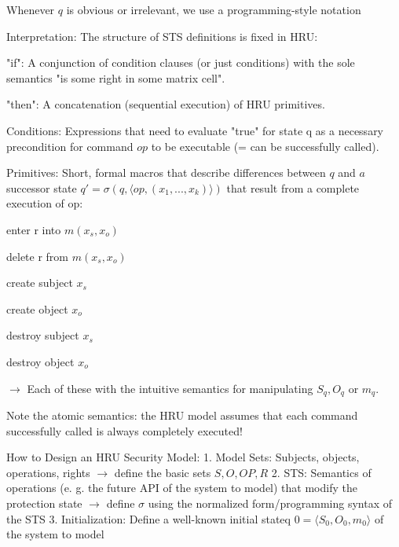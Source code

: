 \documentclass[a4paper]{article}
\begin{document}
\begin{multicols}{3}
    Whenever $q$ is obvious or irrelevant, we use a programming-style notation

    Interpretation: The structure of STS definitions is fixed in HRU:
    \begin{itemize*}
        \item "if": A conjunction of condition clauses (or just conditions) with the sole semantics "is some right in some matrix cell".
        \item "then": A concatenation (sequential execution) of HRU primitives.
    \end{itemize*}

    Conditions:
    Expressions that need to evaluate "true" for state q as a necessary precondition for command $op$ to be executable (= can be successfully called).

    Primitives:
    Short, formal macros that describe differences between $q$ and $a$ successor state $q'=\sigma(q,⟨op,(x_1 ,...,x_k)⟩)$ that result from a complete execution of op:
    \begin{itemize*}
        \item enter r into $m(x_s,x_o)$
        \item delete r from $m(x_s,x_o)$
        \item create subject $x_s$
        \item create object $x_o$
        \item destroy subject $x_s$
        \item destroy object $x_o$
        \item $\rightarrow$  Each of these with the intuitive semantics for manipulating $S_q, O_q$ or $m_q$.
    \end{itemize*}

    Note the atomic semantics: the HRU model assumes that each command successfully called is always completely executed!

    How to Design an HRU Security Model:
    1. Model Sets: Subjects, objects, operations, rights $\rightarrow$  define the basic sets $S,O,OP,R$
    2. STS: Semantics of operations (e. g. the future API of the system to model) that modify the protection state $\rightarrow$  define $\sigma$ using the normalized form/programming syntax of the STS
    3. Initialization: Define a well-known initial stateq $0 =⟨S_0 ,O_0 ,m_0 ⟩$ of the system to model


\end{multicols}
\end{document}

